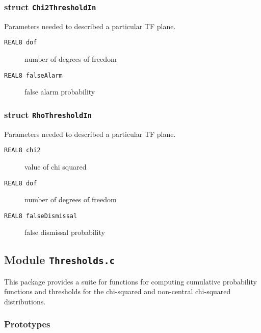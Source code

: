 \subsubsection*{struct \texttt{Chi2ThresholdIn}}

\noindent Parameters needed to described a particular TF plane.

\begin{description}
\item[\texttt{REAL8     dof}]   number of degrees of freedom 
\item[\texttt{REAL8     falseAlarm}]  false alarm probability 
\end{description}

\subsubsection*{struct \texttt{RhoThresholdIn}}

\noindent Parameters needed to described a particular TF plane.

\begin{description}
\item[\texttt{REAL8     chi2}]   value of chi squared  
\item[\texttt{REAL8     dof}]  number of degrees of freedom
\item[\texttt{REAL8     falseDismissal}] false dismissal probability 
\end{description}

\newpage
\subsection{Module \texttt{Thresholds.c}}
\label{ss:Thresholds.c}

This package provides a suite for functions for computing cumulative
probability functions and thresholds for the chi-squared and
non-central chi-squared distributions.

\subsubsection*{Prototypes}
\vspace{0.1in}






